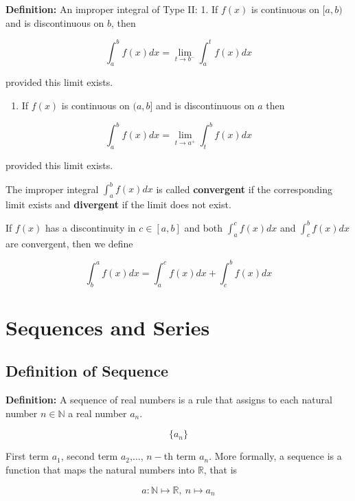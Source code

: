 \documentclass[11pt]{article}
\providecommand{\tightlist}{%
      \setlength{\itemsep}{0pt}\setlength{\parskip}{0pt}}
\begin{document}
{    \textbf{Definition:} An improper integral of Type II: 1. If \(f(x)\) is
continuous on \([a,b)\) and is discontinuous on \(b\), then

\[
\int^{b}_a f(x) dx = \lim_{t\rightarrow b^{-}}\int^t_a f(x) dx
\]

provided this limit exists.

\begin{enumerate}
\def\labelenumi{\arabic{enumi}.}
\setcounter{enumi}{1}
\tightlist
\item
  If \(f(x)\) is continuous on \((a,b]\) and is discontinuous on \(a\)
  then
\end{enumerate}

\[
\int^{b}_a f(x) dx = \lim_{t\rightarrow a^{+}}\int^b_t f(x) dx
\]

provided this limit exists.

The improper integral \(\int^b_a f(x) dx\) is called \textbf{convergent}
if the corresponding limit exists and \textbf{divergent} if the limit
does not exist.

If \(f(x)\) has a discontinuity in \(c\in[a,b]\) and both
\(\int^c_a f(x) dx\) and \(\int^b_c f(x) dx\) are convergent, then we
define

\[
\int_{b}^{a} f(x) dx = \int_{a}^c f(x) dx + \int^{b}_c f(x) dx
\]

    \hypertarget{sequences-and-series}{%
\section{Sequences and Series}\label{sequences-and-series}}

\hypertarget{definition-of-sequence}{%
\subsection{Definition of Sequence}\label{definition-of-sequence}}

\textbf{Definition:} A sequence of real numbers is a rule that assigns
to each natural number \(n\in \mathbb{N}\) a real number \(a_n\).

\[
\{a_n\}
\]

First term \(a_1\), second term \(a_2\),\(\ldots\), \(n-\)th term
\(a_n\). More formally, a sequence is a function that maps the natural
numbers into \(\mathbb{R}\), that is

\[
a : \mathbb{N} \mapsto \mathbb{R}, \ n \mapsto a_n
\]

}
\end{document}
